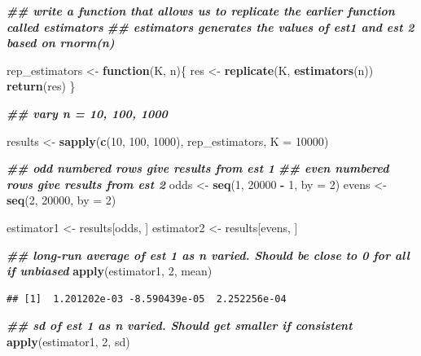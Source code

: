 \documentclass[
]{book}
\newenvironment{Shaded}{\begin{snugshade}}{\end{snugshade}}
\newcommand{\AttributeTok}[1]{\textcolor[rgb]{0.13,0.29,0.53}{#1}}
\newcommand{\ControlFlowTok}[1]{\textcolor[rgb]{0.13,0.29,0.53}{\textbf{#1}}}
\newcommand{\DecValTok}[1]{\textcolor[rgb]{0.00,0.00,0.81}{#1}}
\newcommand{\DocumentationTok}[1]{\textcolor[rgb]{0.56,0.35,0.01}{\textbf{\textit{#1}}}}
\newcommand{\FunctionTok}[1]{\textcolor[rgb]{0.13,0.29,0.53}{\textbf{#1}}}
\newcommand{\NormalTok}[1]{#1}
\newcommand{\OtherTok}[1]{\textcolor[rgb]{0.56,0.35,0.01}{#1}}
\newcommand{\SpecialCharTok}[1]{\textcolor[rgb]{0.81,0.36,0.00}{\textbf{#1}}}
\theoremstyle{definition}
\theoremstyle{definition}
\theoremstyle{definition}
\theoremstyle{definition}
\theoremstyle{remark}
\begin{document}
\begin{Shaded}
\begin{Highlighting}[]
\DocumentationTok{\#\# write a function that allows us to replicate the earlier function called estimators}
\DocumentationTok{\#\# estimators generates the values of est1 and est 2 based on rnorm(n)}

\NormalTok{rep\_estimators }\OtherTok{\textless{}{-}} \ControlFlowTok{function}\NormalTok{(K, n)\{}
\NormalTok{  res }\OtherTok{\textless{}{-}} \FunctionTok{replicate}\NormalTok{(K, }\FunctionTok{estimators}\NormalTok{(n))}
  \FunctionTok{return}\NormalTok{(res)}
\NormalTok{\}}

\DocumentationTok{\#\# vary n = 10, 100, 1000}

\NormalTok{results }\OtherTok{\textless{}{-}} \FunctionTok{sapply}\NormalTok{(}\FunctionTok{c}\NormalTok{(}\DecValTok{10}\NormalTok{, }\DecValTok{100}\NormalTok{, }\DecValTok{1000}\NormalTok{), rep\_estimators, }\AttributeTok{K =} \DecValTok{10000}\NormalTok{)}

\DocumentationTok{\#\# odd numbered rows give results from est 1}
\DocumentationTok{\#\# even numbered rows give results from est 2}
\NormalTok{odds }\OtherTok{\textless{}{-}} \FunctionTok{seq}\NormalTok{(}\DecValTok{1}\NormalTok{, }\DecValTok{20000} \SpecialCharTok{{-}} \DecValTok{1}\NormalTok{, }\AttributeTok{by =} \DecValTok{2}\NormalTok{)}
\NormalTok{evens }\OtherTok{\textless{}{-}} \FunctionTok{seq}\NormalTok{(}\DecValTok{2}\NormalTok{, }\DecValTok{20000}\NormalTok{, }\AttributeTok{by =} \DecValTok{2}\NormalTok{)}

\NormalTok{estimator1 }\OtherTok{\textless{}{-}}\NormalTok{ results[odds, ]}
\NormalTok{estimator2 }\OtherTok{\textless{}{-}}\NormalTok{ results[evens, ]}

\DocumentationTok{\#\# long{-}run average of est 1 as n varied. Should be close to 0 for all if unbiased}
\FunctionTok{apply}\NormalTok{(estimator1, }\DecValTok{2}\NormalTok{, mean)}
\end{Highlighting}
\end{Shaded}

\begin{verbatim}
## [1]  1.201202e-03 -8.590439e-05  2.252256e-04
\end{verbatim}

\begin{Shaded}
\begin{Highlighting}[]
\DocumentationTok{\#\# sd of est 1 as n varied. Should get smaller if consistent}
\FunctionTok{apply}\NormalTok{(estimator1, }\DecValTok{2}\NormalTok{, sd)}
\end{Highlighting}
\end{Shaded}
\end{document}

